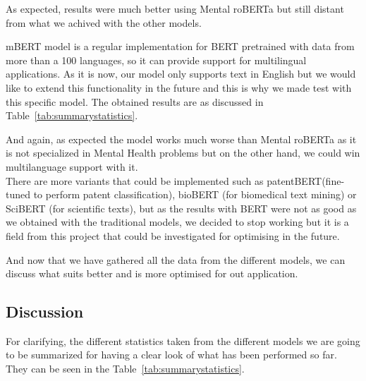 As expected, results were much better using Mental roBERTa but still distant from what we achived with the other models.

mBERT model is a regular implementation for BERT pretrained with data from more than a 100 languages, so it can provide support for multilingual applications. As it is now, our model only supports text in English but we would like to extend this functionality in the future and this is why we made test with this specific model. The obtained results are as discussed in Table~\ref{tab:summarystatistics}.

And again, as expected the model works much worse than Mental roBERTa as it is not specialized in Mental Health problems but on the other hand, we could win multilanguage support with it. \\

There are more variants that could be implemented such as patentBERT(fine-tuned to perform patent classification), bioBERT (for biomedical text mining) or SciBERT (for scientific texts), but as the results with BERT were not as good as we obtained with the traditional models, we decided to stop working but it is a field from this project that could be investigated for optimising in the future.

And now that we have gathered all the data from the different models, we can discuss what suits better and is more optimised for out application.

\subsection{Discussion}
For clarifying, the different statistics taken from the different models we are going to be summarized for having a clear look of what has been performed so far. They can be seen in the Table~\ref{tab:summarystatistics}.

